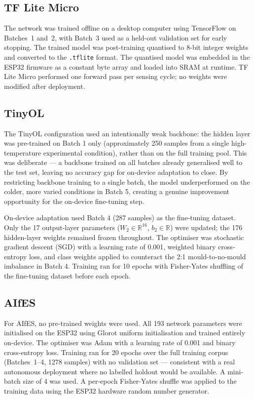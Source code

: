 \subsection{TF Lite Micro}

The network was trained offline on a desktop computer using TensorFlow on Batches~1 and~2, with Batch~3 used as a held-out validation set for early stopping. The trained model was post-training quantised to 8-bit integer weights and converted to the \texttt{.tflite} format. The quantised model was embedded in the ESP32 firmware as a constant byte array and loaded into SRAM at runtime. TF Lite Micro performed one forward pass per sensing cycle; no weights were modified after deployment.

\subsection{TinyOL}

The TinyOL configuration used an intentionally weak backbone: the hidden layer was pre-trained on Batch 1 only (approximately 250 samples from a single high-temperature experimental condition), rather than on the full training pool. This was deliberate --- a backbone trained on all batches already generalised well to the test set, leaving no accuracy gap for on-device adaptation to close. By restricting backbone training to a single batch, the model underperformed on the colder, more varied conditions in Batch 5, creating a genuine improvement opportunity for the on-device fine-tuning step.

On-device adaptation used Batch 4 (287 samples) as the fine-tuning dataset. Only the 17 output-layer parameters ($W_2 \in \mathbb{R}^{16}$, $b_2 \in \mathbb{R}$) were updated; the 176 hidden-layer weights remained frozen throughout. The optimiser was stochastic gradient descent (SGD) with a learning rate of 0.001, weighted binary cross-entropy loss, and class weights applied to counteract the 2:1 mould-to-no-mould imbalance in Batch 4. Training ran for 10 epochs with Fisher-Yates shuffling of the fine-tuning dataset before each epoch.

\subsection{AIfES}

For AIfES, no pre-trained weights were used. All 193 network parameters were initialised on the ESP32 using Glorot uniform initialisation and trained entirely on-device. The optimiser was Adam with a learning rate of 0.001 and binary cross-entropy loss. Training ran for 20 epochs over the full training corpus (Batches~1--4, 1278 samples) with no validation set --- consistent with a real autonomous deployment where no labelled holdout would be available. A mini-batch size of 4 was used. A per-epoch Fisher-Yates shuffle was applied to the training data using the ESP32 hardware random number generator.

